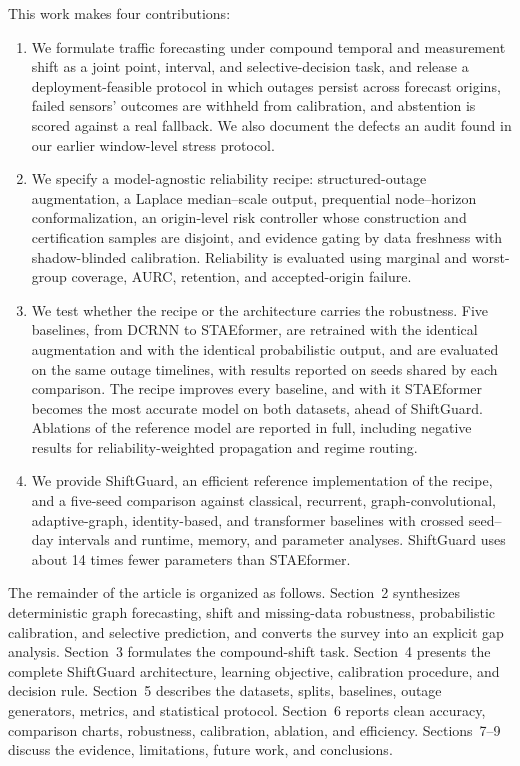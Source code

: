 \documentclass[preprint,12pt]{elsarticle}
\begin{document}
This work makes four contributions:
\begin{enumerate}
  \item We formulate traffic forecasting under compound temporal and
  measurement shift as a joint point, interval, and selective-decision task,
  and release a deployment-feasible protocol in which outages persist across
  forecast origins, failed sensors' outcomes are withheld from calibration, and
  abstention is scored against a real fallback. We also document the defects an
  audit found in our earlier window-level stress protocol.
  \item We specify a model-agnostic reliability recipe: structured-outage
  augmentation, a Laplace median--scale output, prequential node--horizon
  conformalization, an origin-level risk controller whose construction and
  certification samples are disjoint, and evidence gating by data freshness with
  shadow-blinded calibration. Reliability is evaluated using marginal and
  worst-group coverage, AURC, retention, and accepted-origin failure.
  \item We test whether the recipe or the architecture carries the robustness.
  Five baselines, from DCRNN to STAEformer, are retrained with the identical
  augmentation and with the identical probabilistic output, and are evaluated on
  the same outage timelines, with results reported on seeds shared by each
  comparison. The recipe improves every baseline, and with it STAEformer becomes
the most accurate model on both datasets, ahead of ShiftGuard. Ablations of
  the reference model are reported in full, including negative results for
  reliability-weighted propagation and regime routing.
  \item We provide ShiftGuard, an efficient reference implementation of the
  recipe, and a five-seed comparison against classical, recurrent,
  graph-convolutional, adaptive-graph, identity-based, and transformer
  baselines with crossed seed--day intervals and runtime, memory, and parameter
  analyses. ShiftGuard uses about 14 times fewer parameters than STAEformer.
\end{enumerate}

The remainder of the article is organized as follows. Section~2 synthesizes
deterministic graph forecasting, shift and missing-data robustness,
probabilistic calibration, and selective prediction, and converts the survey
into an explicit gap analysis. Section~3 formulates the compound-shift task.
Section~4 presents the complete ShiftGuard architecture, learning objective,
calibration procedure, and decision rule. Section~5 describes the datasets,
splits, baselines, outage generators, metrics, and statistical protocol.
Section~6 reports clean accuracy, comparison charts, robustness, calibration,
ablation, and efficiency. Sections~7--9 discuss the evidence, limitations,
future work, and conclusions.
\end{document}
